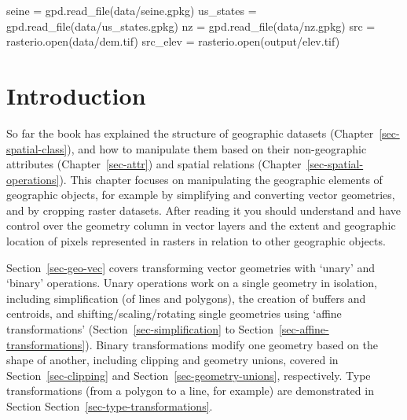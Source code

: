 \documentclass[
  letterpaper,
]{krantz}
\newenvironment{Shaded}{\begin{snugshade}}{\end{snugshade}}
\newcommand{\BuiltInTok}[1]{\textcolor[rgb]{0.00,0.23,0.31}{#1}}
\newcommand{\NormalTok}[1]{\textcolor[rgb]{0.00,0.23,0.31}{#1}}
\newcommand{\OperatorTok}[1]{\textcolor[rgb]{0.37,0.37,0.37}{#1}}
\newcommand{\StringTok}[1]{\textcolor[rgb]{0.13,0.47,0.30}{#1}}
\begin{document}
\begin{Shaded}
\begin{Highlighting}[]
\NormalTok{seine }\OperatorTok{=}\NormalTok{ gpd.read\_file(}\StringTok{\textquotesingle{}data/seine.gpkg\textquotesingle{}}\NormalTok{)}
\NormalTok{us\_states }\OperatorTok{=}\NormalTok{ gpd.read\_file(}\StringTok{\textquotesingle{}data/us\_states.gpkg\textquotesingle{}}\NormalTok{)}
\NormalTok{nz }\OperatorTok{=}\NormalTok{ gpd.read\_file(}\StringTok{\textquotesingle{}data/nz.gpkg\textquotesingle{}}\NormalTok{)}
\NormalTok{src }\OperatorTok{=}\NormalTok{ rasterio.}\BuiltInTok{open}\NormalTok{(}\StringTok{\textquotesingle{}data/dem.tif\textquotesingle{}}\NormalTok{)}
\NormalTok{src\_elev }\OperatorTok{=}\NormalTok{ rasterio.}\BuiltInTok{open}\NormalTok{(}\StringTok{\textquotesingle{}output/elev.tif\textquotesingle{}}\NormalTok{)}
\end{Highlighting}
\end{Shaded}

\section{Introduction}\label{introduction-3}

So far the book has explained the structure of geographic datasets
(Chapter~\ref{sec-spatial-class}), and how to manipulate them based on
their non-geographic attributes (Chapter~\ref{sec-attr}) and spatial
relations (Chapter~\ref{sec-spatial-operations}). This chapter focuses
on manipulating the geographic elements of geographic objects, for
example by simplifying and converting vector geometries, and by cropping
raster datasets. After reading it you should understand and have control
over the geometry column in vector layers and the extent and geographic
location of pixels represented in rasters in relation to other
geographic objects.

Section~\ref{sec-geo-vec} covers transforming vector geometries with
`unary' and `binary' operations. Unary operations work on a single
geometry in isolation, including simplification (of lines and polygons),
the creation of buffers and centroids, and shifting/scaling/rotating
single geometries using `affine transformations'
(Section~\ref{sec-simplification} to
Section~\ref{sec-affine-transformations}). Binary transformations modify
one geometry based on the shape of another, including clipping and
geometry unions, covered in Section~\ref{sec-clipping} and
Section~\ref{sec-geometry-unions}, respectively. Type transformations
(from a polygon to a line, for example) are demonstrated in Section
Section~\ref{sec-type-transformations}.
\end{document}
